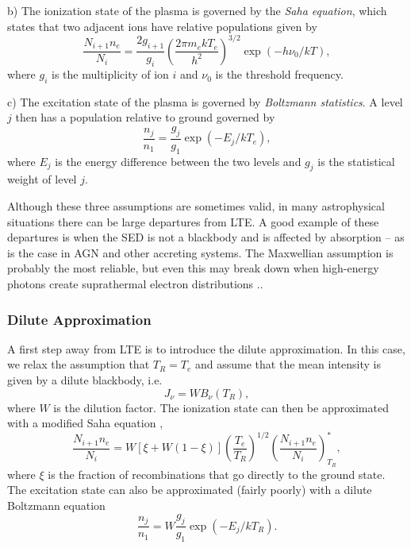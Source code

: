 \smallskip

b) The ionization state of the plasma is governed by the {\em Saha equation},
which states that two adjacent ions have relative populations given by
\begin{equation}
\frac{N_{i+1}n_e}{N_i} = \frac{2g_{i+1}}{g_i} 
\left( \frac{2 \pi m_e kT_e}{h^2} \right)^{3/2}
\exp(-h \nu_0/kT),
\label{eq:saha}
\end{equation}
where $g_i$ is the multiplicity of ion $i$ and $\nu_0$ is the threshold frequency.

\smallskip

c) The excitation state of the plasma is governed by {\em Boltzmann statistics}.
A level $j$ then has a population relative to ground governed by
\begin{equation}
\frac{n_{j}}{n_1} = \frac{g_j}{g_1} \exp(-E_j/kT_e), 
\label{eq:boltzmann}
\end{equation}
where $E_j$ is the energy difference between the two levels and 
$g_j$ is the statistical weight of level $j$.

\smallskip

Although these three assumptions are sometimes valid, in many astrophysical situations
there can be large departures from LTE. A good example of these departures is when
the SED is not a blackbody and is affected by absorption -- 
as is the case in AGN and other accreting systems. The Maxwellian assumption 
is probably the most reliable, but even this may break down
when high-energy photons create suprathermal electron distributions 
\citep{humphrey2014}..

\subsubsection{Dilute Approximation}
\label{sec:dilute}
A first step away from LTE is to introduce the dilute approximation. In this case,
we relax the assumption that $T_R = T_e$ and assume that the mean intensity is given
by a dilute blackbody, i.e.  
\begin{equation}
J_\nu = W B_\nu (T_R),
\label{eq:dilute_jnu}
\end{equation}
where $W$ is the dilution factor. The ionization state can then be approximated 
with a modified Saha equation \citep{AL85,ML93}, 
\begin{equation}
\frac{N_{i+1} n_e}{N_i} = W [\xi + W(1-\xi)]
\left(\frac{T_e}{T_R}\right)^{1/2}
\left(\frac{N_{i+1}n_e}{N_i}\right)^*_{T_R}, \label{eq:ml93}
\end{equation}
where $\xi$ is the fraction of recombinations that go directly to
the ground state.
The excitation state can also be approximated (fairly poorly) 
with a dilute Boltzmann equation \citep{AL85,lucy1999sne}
\begin{equation}
\frac{n_{j}}{n_{1}} = W \frac{g_j}{g_{1}} \exp(-E_j/kT_R).
\label{eq:dilute_boltzmann}
\end{equation}


